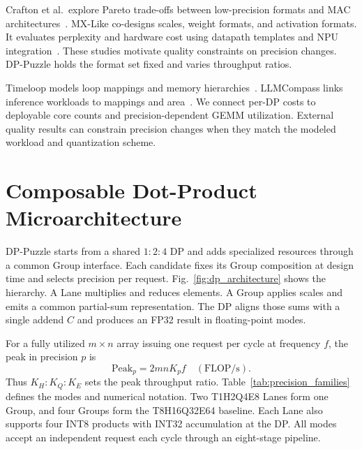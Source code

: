 \documentclass[conference,9pt,letterpaper]{IEEEtran}
\begin{document}
Crafton et al.\ explore Pareto trade-offs between low-precision formats and MAC architectures~\cite{paretomac2025}. MX-Like co-designs scales, weight formats, and activation formats. It evaluates perplexity and hardware cost using datapath templates and NPU integration~\cite{zhao2026mxlike}. These studies motivate quality constraints on precision changes. DP-Puzzle holds the format set fixed and varies throughput ratios.

Timeloop models loop mappings and memory hierarchies~\cite{timeloop2019}. LLMCompass links inference workloads to mappings and area~\cite{zhang2024llmcompass}. We connect per-DP costs to deployable core counts and precision-dependent GEMM utilization. External quality results can constrain precision changes when they match the modeled workload and quantization scheme.

\section{Composable Dot-Product Microarchitecture}
\label{sec:architecture}
\label{sec:brick_definition}

DP-Puzzle starts from a shared $1:2:4$ DP and adds specialized resources through a common Group interface. Each candidate fixes its Group composition at design time and selects precision per request. Fig.~\ref{fig:dp_architecture} shows the hierarchy. A Lane multiplies and reduces elements. A Group applies scales and emits a common partial-sum representation. The DP aligns those sums with a single addend $C$ and produces an FP32 result in floating-point modes.

For a fully utilized $m\times n$ array issuing one request per cycle at frequency $f$, the peak in precision $p$ is
\begin{equation}
\mathrm{Peak}_p=2mnK_pf\quad(\mathrm{FLOP/s}).
\label{eq:array_peak_throughput}
\end{equation}
Thus $K_H:K_Q:K_E$ sets the peak throughput ratio. Table~\ref{tab:precision_families} defines the modes and numerical notation. Two T1H2Q4E8 Lanes form one Group, and four Groups form the T8H16Q32E64 baseline. Each Lane also supports four INT8 products with INT32 accumulation at the DP. All modes accept an independent request each cycle through an eight-stage pipeline.
\end{document}
